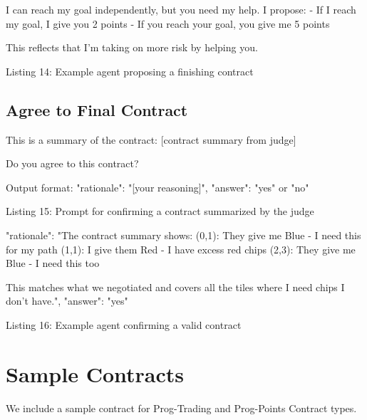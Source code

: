\documentclass{article} %
\newcommand{\PTC}{Prog-Trading\xspace}
\newcommand{\PPC}{Prog-Points\xspace}
\begin{document}
\begin{promptbox}
I can reach my goal independently, but you need my help.
I propose:
- If I reach my goal, I give you 2 points
- If you reach your goal, you give me 5 points

This reflects that I'm taking on more risk by helping you.
\end{promptbox}
\vspace{-8pt}
\begin{center}\small Listing 14: Example agent proposing a finishing contract\end{center}

\subsection{Agree to Final Contract}

\begin{promptbox}

This is a summary of the contract:
[contract summary from judge]

Do you agree to this contract?

Output format:
{
  "rationale": "[your reasoning]",
  "answer": "yes" or "no"
}
\end{promptbox}
\vspace{-8pt}
\begin{center}\small Listing 15: Prompt for confirming a contract summarized by the judge\end{center}

\begin{promptbox}
{
  "rationale": "The contract summary shows:
  (0,1): They give me Blue - I need this for my path
  (1,1): I give them Red - I have excess red chips
  (2,3): They give me Blue - I need this too

  This matches what we negotiated and covers all the tiles
  where I need chips I don't have.",
  "answer": "yes"
}
\end{promptbox}
\vspace{-8pt}
\begin{center}\small Listing 16: Example agent confirming a valid contract\end{center}

\clearpage


\section{Sample Contracts}
\label{appendix:sample_contracts}
We include a sample contract for \PTC and \PPC Contract types.
\end{document}

